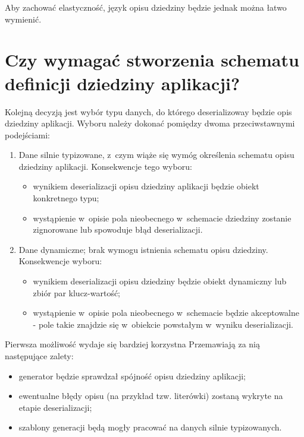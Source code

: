 Aby zachować elastyczność, język opisu dziedziny będzie jednak można łatwo wymienić.



\section{Czy wymagać stworzenia schematu definicji dziedziny aplikacji?} \label{sec:core:domain_schema_requirement}

Kolejną decyzją jest wybór typu danych, do którego deserializoway będzie opis dziedziny aplikacji.
Wyboru należy dokonać pomiędzy dwoma przeciwstawnymi podejściami:

\begin{enumerate}
 \item Dane silnie typizowane, z~czym wiąże się wymóg określenia schematu opisu dziedziny aplikacji.
  Konsekwencje tego wyboru:
  \begin{itemize}
   \item wynikiem deserializacji opisu dziedziny aplikacji będzie obiekt konkretnego typu;
   \item wystąpienie w~opisie pola nieobecnego w~schemacie dziedziny zostanie zignorowane lub spowoduje błąd deserializacji.
  \end{itemize}
 \item Dane dynamiczne; brak wymogu istnienia schematu opisu dziedziny.
  Konsekwencje wyboru:
  \begin{itemize}
   \item wynikiem deserializacji opisu dziedziny będzie obiekt dynamiczny lub zbiór par klucz-wartość;
   \item wystąpienie w~opisie pola nieobecnego w~schemacie będzie akceptowalne - pole takie znajdzie się w~obiekcie powstałym w~wyniku deserializacji.
  \end{itemize}

\end{enumerate}

Pierwsza możliwość wydaje się bardziej korzystna
Przemawiają za nią następujące zalety:

\begin{itemize}
 \item generator będzie sprawdzał spójność opisu dziedziny aplikacji;
 \item ewentualne błędy opisu (na przykład tzw. literówki) zostaną wykryte na etapie deserializacji;
 \item szablony generacji będą mogły pracować na danych silnie typizowanych.
\end{itemize}

